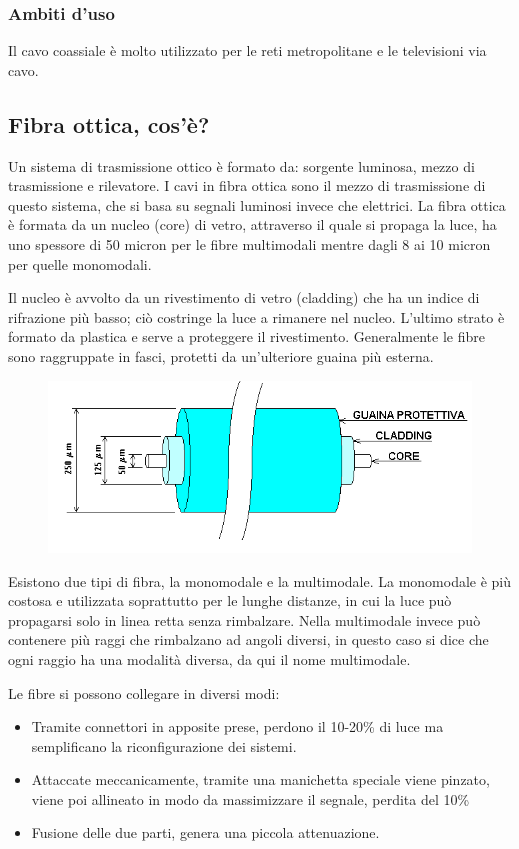 \subsubsection{Ambiti d'uso}
Il cavo coassiale è molto utilizzato per le reti metropolitane e le televisioni via cavo.

\subsection{Fibra ottica, cos'è?}
Un sistema di trasmissione ottico è formato da: sorgente luminosa, mezzo di trasmissione e rilevatore.
I cavi in fibra ottica sono il mezzo di trasmissione di questo sistema, che si basa su segnali luminosi invece che elettrici.
La fibra ottica è formata da un nucleo (core) di vetro, attraverso il quale si propaga la luce, ha uno spessore di 50 micron per le fibre multimodali mentre dagli 8 ai 10 micron per quelle monomodali.

Il nucleo è avvolto da un rivestimento di vetro (cladding) che ha un indice di rifrazione più basso;
ciò costringe la luce a rimanere nel nucleo. L’ultimo strato è formato da plastica e serve a proteggere il rivestimento.
Generalmente le fibre sono raggruppate in fasci, protetti da un’ulteriore guaina più esterna.  

\begin{figure}[H]
\centering
\includegraphics[scale=0.7]{res/img/3_FibraOttica.png}
\end{figure}

Esistono due tipi di fibra, la monomodale e la multimodale.
La monomodale è più costosa e utilizzata soprattutto per le lunghe distanze, in cui la luce può propagarsi solo in linea retta senza rimbalzare.
Nella multimodale invece può contenere più raggi che rimbalzano ad angoli diversi, in questo caso si dice che ogni raggio ha una modalità diversa, da qui il nome multimodale.

Le fibre si possono collegare in diversi modi:
\begin{itemize}
\item Tramite connettori in apposite prese, perdono il 10-20\% di luce ma semplificano la riconfigurazione dei sistemi. 
\item Attaccate meccanicamente, tramite una manichetta speciale viene pinzato, viene poi allineato in modo da massimizzare il segnale, perdita del 10\% 
\item Fusione delle due parti, genera una piccola attenuazione.
\end{itemize}

